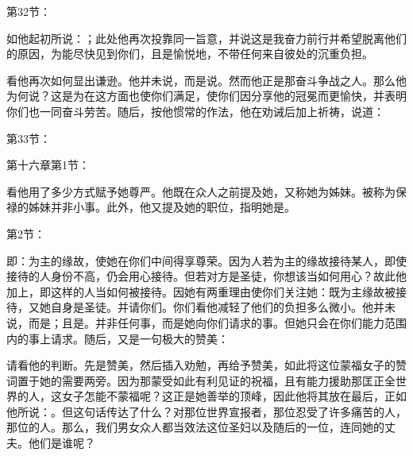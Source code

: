 第32节：\par

如他起初所说：；此处他再次投靠同一旨意，并说这是我奋力前行并希望脱离他们的原因，为能尽快见到你们，且是愉悦地，不带任何来自彼处的沉重负担。\par

看他再次如何显出谦逊。他并未说，而是说。然而他正是那奋斗争战之人。那么他为何说？这是为在这方面也使你们满足，使你们因分享他的冠冕而更愉快，并表明你们也一同奋斗劳苦。随后，按他惯常的作法，他在劝诫后加上祈祷，说道：\par

第33节：\par

第十六章第1节：\par

看他用了多少方式赋予她尊严。他既在众人之前提及她，又称她为姊妹。被称为保禄的姊妹并非小事。此外，他又提及她的职位，指明她是。\par

第2节：\par

即：为主的缘故，使她在你们中间得享尊荣。因为人若为主的缘故接待某人，即使接待的人身份不高，仍会用心接待。但若对方是圣徒，你想该当如何用心？故此他加上，即这样的人当如何被接待。因她有两重理由使你们关注她：既为主缘故被接待，又她自身是圣徒。并请你们。你们看他减轻了他们的负担多么微小。他并未说，而是；且是。并非任何事，而是她向你们请求的事。但她只会在你们能力范围内的事上请求。随后，又是一句极大的赞美：\par

请看他的判断。先是赞美，然后插入劝勉，再给予赞美，如此将这位蒙福女子的赞词置于她的需要两旁。因为那蒙受如此有利见证的祝福，且有能力援助那匡正全世界的人，这女子怎能不蒙福呢？这正是她善举的顶峰，因此他将其放在最后，正如他所说：。但这句话传达了什么？对那位世界宣报者，那位忍受了许多痛苦的人，那位的人。那么，我们男女众人都当效法这位圣妇以及随后的一位，连同她的丈夫。他们是谁呢？\par

